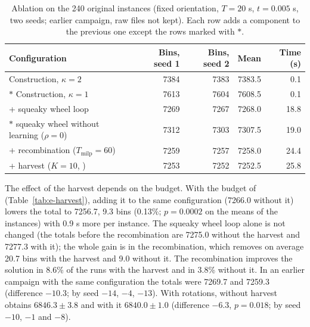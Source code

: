 \begin{table}[t]
\centering
\small\setlength{\tabcolsep}{4pt}
\caption{Ablation on the 240 original instances (fixed orientation, $T=20$ s, $t=0.005$ s, two seeds; earlier campaign, raw files not kept).
Each row adds a component to the previous one except the rows marked with $\ast$.}
\label{tab:e-ablation}
\begin{tabular}{@{}lrrrr@{}}
\toprule
Configuration & Bins, seed 1 & Bins, seed 2 & Mean & Time (s)\\
\midrule
Construction, $\kappa=2$ & 7384 & 7383 & 7383.5 & 0.1\\
$\ast$ Construction, $\kappa=1$ & 7613 & 7604 & 7608.5 & 0.1\\
+ squeaky wheel loop & 7269 & 7267 & 7268.0 & 18.8\\
$\ast$ squeaky wheel without learning ($\rho=0$) & 7312 & 7303 & 7307.5 & 19.0\\
+ recombination ($T_{\mathrm{milp}}=60$) & 7259 & 7257 & 7258.0 & 24.4\\
+ harvest ($K=10$, \cfgbal{}) & 7253 & 7252 & 7252.5 & 25.8\\
\bottomrule
\end{tabular}
\end{table}

The effect of the harvest depends on the budget. With the budget of \cfgfast{} (Table~\ref{tab:e-harvest}), adding it to the same configuration
(7266.0 without it) lowers the total to 7256.7, 9.3 bins (0.13\%; $p=0.0002$ on the means of the instances) with 0.9 s more per instance. The squeaky wheel loop alone is not changed
(the totals before the recombination are 7275.0 without the harvest and 7277.3 with it); the whole gain is in the recombination, which removes on average 20.7 bins with the harvest and 9.0
without it. The recombination improves the solution in 8.6\% of the runs with the harvest and in 3.8\% without it. In an earlier campaign with the same
configuration the totals were 7269.7 and 7259.3 (difference $-10.3$; by seed $-14$, $-4$, $-13$). With rotations, \cfgfast{} without harvest obtains $6846.3\pm 3.8$ and with it $6840.0\pm 1.0$ (difference $-6.3$, $p=0.018$;
by seed $-10$, $-1$ and $-8$).


